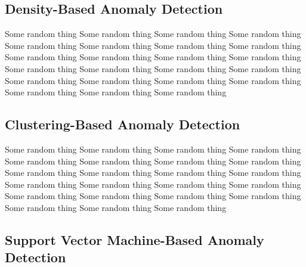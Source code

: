 \subsection{Density-Based Anomaly Detection} 
Some random thing Some random thing Some random thing Some random thing Some random thing Some random thing Some random thing Some random thing Some random thing Some random thing Some random thing Some random thing Some random thing Some random thing Some random thing Some random thing Some random thing Some random thing Some random thing Some random thing Some random thing Some random thing Some random thing  
\subsection{Clustering-Based Anomaly Detection }

Some random thing Some random thing Some random thing Some random thing Some random thing Some random thing Some random thing Some random thing Some random thing Some random thing Some random thing Some random thing Some random thing Some random thing Some random thing Some random thing Some random thing Some random thing Some random thing Some random thing Some random thing Some random thing Some random thing  
\subsection{Support Vector Machine-Based Anomaly Detection}


